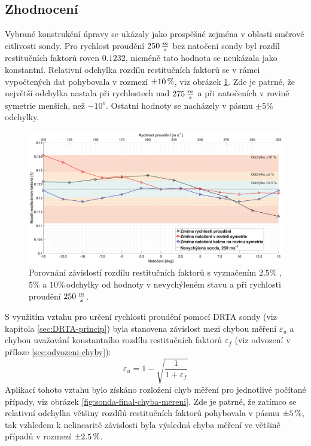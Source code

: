         \newpage
        \subsection{Zhodnocení}

            Vybrané konstrukční úpravy se ukázaly jako prospěšné zejména v oblasti směrové citlivosti sondy. Pro rychlost proudění $250 \, \frac{m}{s}$ bez natočení sondy byl rozdíl restitučních faktorů roven $0.1232$, nicméně tato hodnota se neukázala jako konstantní. Relativní odchylka rozdílu restitučních faktorů se v rámci vypočtených dat pohybovala v rozmezí $\pm10 \, \%$, viz obrázek \ref{fig:sonda-final-rozdil-restitucnich-faktoru}. Zde je patrné, že největší odchylka nastala při rychlostech nad $275 \, \frac{m}{s}$ a při natočeních v rovině symetrie menších, než $-10^o$. Ostatní hodnoty se nacházely v pásmu $\pm5\%$ odchylky.

            \begin{figure}[ht!]
                \centering
                \includegraphics*[width=\textwidth]{500_FINAL/final_rozdil_restitucnich_faktoru.eps}
                \caption{Porovnání závislostí rozdílu restitučních faktorů s vyznačením $2.5\%$ ,$5\%$ a $10\%$\,odchylky od hodnoty v nevychýleném stavu a při rychlosti proudění $250 \, \frac{m}{s}$.}
                \label{fig:sonda-final-rozdil-restitucnich-faktoru}
            \end{figure}

            

            S využitím vztahu pro určení rychlosti proudění pomocí DRTA sondy (viz \linebreak kapitola \ref{sec:DRTA-princip}) byla stanovena závislost mezi chybou měření $\varepsilon _u$ a chybou uvažování konstantního rozdílu restitučních faktorů $\varepsilon _f$ (viz odvození v příloze \ref{sec:odvozeni-chyby}):
            \begin{equation} \label{eq:chyba-mereni}
                \varepsilon _u = 1 - \sqrt{\frac{1}{1 + \varepsilon _f}}
            \end{equation}
            Aplikací tohoto vztahu bylo získáno rozložení chyb měření pro jednotlivé počítané případy, viz obrázek \ref{fig:sonda-final-chyba-mereni}. Zde je patrné, že zatímco se relativní odchylka většiny rozdílů restitučních faktorů pohybovala v pásmu $\pm5 \, \%$, tak vzhledem k nelinearitě závislosti byla výsledná chyba měření ve většině případů v rozmezí $\pm2.5 \, \%$. 

